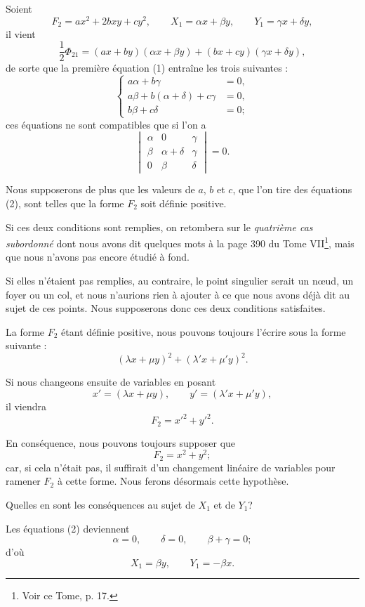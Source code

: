 \documentclass[11pt]{article}
\begin{document}
Soient
\[
F_2=ax^2+2bxy+cy^2,
\qquad
X_1=\alpha x+\beta y,
\qquad
Y_1=\gamma x+\delta y,
\]
il vient
\[
\frac{1}{2}\Phi_{21}=(ax+by)(\alpha x+\beta y)+(bx+cy)(\gamma x+\delta y),
\]
de sorte que la première équation (1) entraîne les trois suivantes :
\begin{equation}\tag{2}
\left\{
\begin{aligned}
a\alpha+b\gamma&=0,\\
a\beta+b(\alpha+\delta)+c\gamma&=0,\\
b\beta+c\delta&=0;
\end{aligned}
\right.
\end{equation}
ces équations ne sont compatibles que si l’on a
\begin{equation}\tag{3}
\begin{vmatrix}
\alpha&0&\gamma\\
\beta&\alpha+\delta&\gamma\\
0&\beta&\delta
\end{vmatrix}=0.
\end{equation}

Nous supposerons de plus que les valeurs de $a$, $b$ et $c$, que l’on tire des équations (2), sont telles que la forme $F_2$ soit définie positive.

Si ces deux conditions sont remplies, on retombera sur le \emph{quatrième cas subordonné} dont nous avons dit quelques mots à la page 390 du Tome VII\footnote{Voir ce Tome, p. 17.}, mais que nous n’avons pas encore étudié à fond.

Si elles n’étaient pas remplies, au contraire, le point singulier serait un nœud, un foyer ou un col, et nous n’aurions rien à ajouter à ce que nous avons déjà dit au sujet de ces points. Nous supposerons donc ces deux conditions satisfaites.

La forme $F_2$ étant définie positive, nous pouvons toujours l’écrire sous la forme suivante :
\[
(\lambda x+\mu y)^2+(\lambda' x+\mu' y)^2.
\]

Si nous changeons ensuite de variables en posant
\[
x'=(\lambda x+\mu y),
\qquad
y'=(\lambda'x+\mu'y),
\]
il viendra
\[
F_2=x'^2+y'^2.
\]

En conséquence, nous pouvons toujours supposer que
\[
F_2=x^2+y^2;
\]
car, si cela n’était pas, il suffirait d’un changement linéaire de variables pour ramener $F_2$ à cette forme. Nous ferons désormais cette hypothèse.

Quelles en sont les conséquences au sujet de $X_1$ et de $Y_1$?

Les équations (2) deviennent
\[
\alpha=0,
\qquad
\delta=0,
\qquad
\beta+\gamma=0;
\]
d’où
\[
X_1=\beta y,
\qquad
Y_1=-\beta x.
\]
\end{document}
